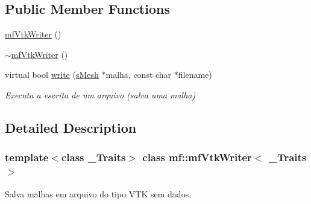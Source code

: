 \subsection*{Public Member Functions}
\begin{DoxyCompactItemize}
\item 
\hyperlink{classmf_1_1mfVtkWriter_a981208aefeab8ed552b17736d950c43f}{mfVtkWriter} ()
\item 
\hyperlink{classmf_1_1mfVtkWriter_a0c3deace28d01f480d36cb96dc284595}{$\sim$mfVtkWriter} ()
\item 
virtual bool \hyperlink{classmf_1_1mfVtkWriter_a5385afe137ace0a1c5dafed8e74c4c35}{write} (\hyperlink{classmf_1_1mfVtkWriter_a0627a25b5da983842978040d92539e9e}{sMesh} $\ast$malha, const char $\ast$filename)
\begin{DoxyCompactList}\small\item\em Executa a escrita de um arquivo (salva uma malha) \item\end{DoxyCompactList}\end{DoxyCompactItemize}


\subsection{Detailed Description}
\subsubsection*{template$<$class \_\-Traits$>$ class mf::mfVtkWriter$<$ \_\-Traits $>$}

Salva malhas em arquivo do tipo VTK sem dados. 

